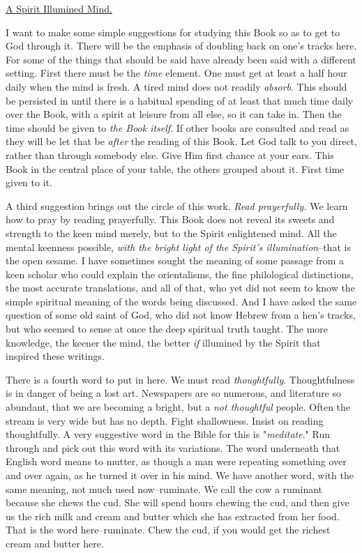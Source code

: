 \underline{A Spirit Illumined Mind.}


I want to make some simple suggestions for studying this Book so as to get
to God through it. There will be the emphasis of doubling back on one's
tracks here. For some of the things that should be said have already been
said with a different setting. First there must be the \textit{time} element.
One must get at least a half hour daily when the mind is fresh. A tired
mind does not readily \textit{absorb}. This should be persisted in until there is
a habitual spending of at least that much time daily over the Book, with a
spirit at leisure from all else, so it can take in. Then the time should
be given to \textit{the Book itself}. If other books are consulted and read as
they will be let that be \textit{after} the reading of this Book. Let God talk to
you direct, rather than through somebody else. Give Him first chance at
your ears. This Book in the central place of your table, the others
grouped about it. First time given to it.

A third suggestion brings out the circle of this work. \textit{Read prayerfully.}
We learn how to pray by reading prayerfully. This Book does not reveal its
sweets and strength to the keen mind merely, but to the Spirit enlightened
mind. All the mental keenness possible, \textit{with the bright light of the
Spirit's illumination}--that is the open sesame. I have sometimes sought
the meaning of some passage from a keen scholar who could explain the
orientalisms, the fine philological distinctions, the most accurate
translations, and all of that, who yet did not seem to know the simple
spiritual meaning of the words being discussed. And I have asked the same
question of some old saint of God, who did not know Hebrew from a hen's
tracks, but who seemed to sense at once the deep spiritual truth taught.
The more knowledge, the keener the mind, the better \textit{if} illumined by the
Spirit that inspired these writings.

There is a fourth word to put in here. We must read \textit{thoughtfully}.
Thoughtfulness is in danger of being a lost art. Newspapers are so
numerous, and literature so abundant, that we are becoming a bright, but a
\textit{not thoughtful} people. Often the stream is very wide but has no depth.
Fight shallowness. Insist on reading thoughtfully. A very suggestive word
in the Bible for this is "\textit{meditate}." Run through and pick out this word
with its variations. The word underneath that English word means to
mutter, as though a man were repeating something over and over again, as
he turned it over in his mind. We have another word, with the same
meaning, not much used now--ruminate. We call the cow a ruminant because
she chews the cud. She will spend hours chewing the cud, and then give us
the rich milk and cream and butter which she has extracted from her food.
That is the word here--ruminate. Chew the cud, if you would get the
richest cream and butter here.

